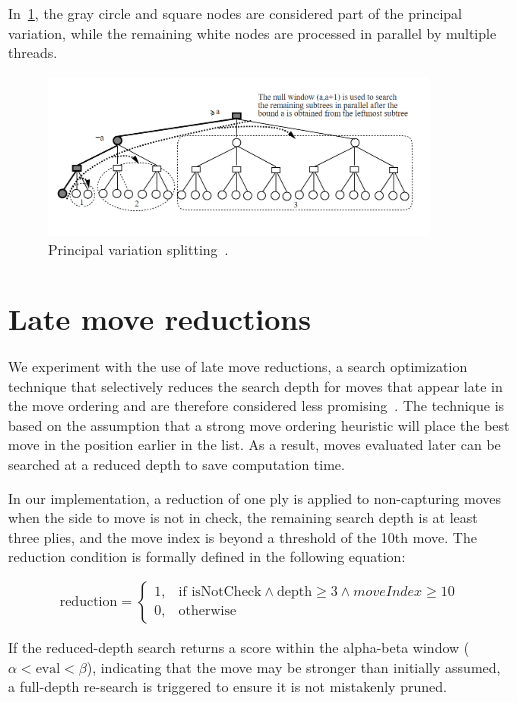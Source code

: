 \vspace{1em}

\noindent In~\cref{fig:pvsplitting}, the gray circle and square nodes are considered part of the principal variation, while the remaining white nodes are processed in parallel by multiple threads.

\begin{figure}
   \centering
   \includegraphics[width=0.9\textwidth]{Imagenes/Bitmap/pvsplitting.png}
   \caption{Principal variation splitting~\cite{PVSplitting}.}\label{fig:pvsplitting}
\end{figure}

\newpage
\section{Late move reductions}

\noindent We experiment with the use of late move reductions, a search optimization technique that selectively reduces the search depth for moves that appear late in the move ordering and are therefore considered less promising~\cite{LateMoveReductions}. The technique is based on the assumption that a strong move ordering heuristic will place the best move in the position earlier in the list. As a result, moves evaluated later can be searched at a reduced depth to save computation time.

\vspace{1em}

\par
In our implementation, a reduction of one ply is applied to non-capturing moves when the side to move is not in check, the remaining search depth is at least three plies, and the move index is beyond a threshold of the 10th move. The reduction condition is formally defined in the following equation:

\begin{equation*}
\text{reduction} = 
\begin{cases}
1, & \text{if } \text{isNotCheck} \wedge \text{depth} \geq 3 \wedge moveIndex \geq 10 \\
0, & \text{otherwise}
\end{cases}
\end{equation*}

\vspace{1em}

\par
If the reduced-depth search returns a score within the alpha-beta window ($\alpha < \text{eval} < \beta$), indicating that the move may be stronger than initially assumed, a full-depth re-search is triggered to ensure it is not mistakenly pruned.


